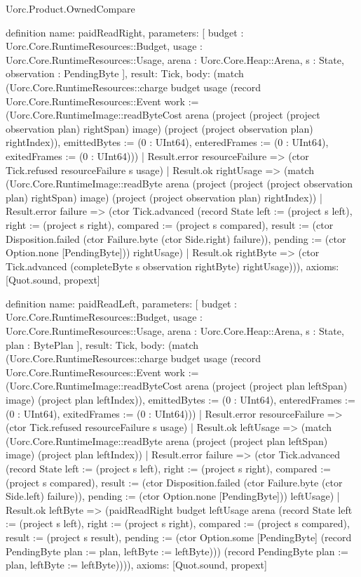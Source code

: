 \begin{lexlean}{Uorc.Product.OwnedCompare}
\begin{semanticmodule}
definition{
  name: paidReadRight,
  parameters: [
    budget : Uorc.Core.RuntimeResources::Budget,
    usage : Uorc.Core.RuntimeResources::Usage,
    arena : Uorc.Core.Heap::Arena,
    s : State,
    observation : PendingByte
  ],
  result: Tick,
  body: (match (Uorc.Core.RuntimeResources::charge budget usage (record Uorc.Core.RuntimeResources::Event {work := (Uorc.Core.RuntimeImage::readByteCost arena (project (project (project observation plan) rightSpan) image) (project (project observation plan) rightIndex)), emittedBytes := (0 : UInt64), enteredFrames := (0 : UInt64), exitedFrames := (0 : UInt64)}))
    | Result.error resourceFailure => (ctor Tick.refused resourceFailure s usage)
    | Result.ok rightUsage => (match (Uorc.Core.RuntimeImage::readByte arena (project (project (project observation plan) rightSpan) image) (project (project observation plan) rightIndex))
      | Result.error failure => (ctor Tick.advanced (record State {left := (project s left), right := (project s right), compared := (project s compared), result := (ctor Disposition.failed (ctor Failure.byte (ctor Side.right) failure)), pending := (ctor Option.none [PendingByte])}) rightUsage)
      | Result.ok rightByte => (ctor Tick.advanced (completeByte s observation rightByte) rightUsage))),
  axioms: [Quot.sound, propext]
}

definition{
  name: paidReadLeft,
  parameters: [
    budget : Uorc.Core.RuntimeResources::Budget,
    usage : Uorc.Core.RuntimeResources::Usage,
    arena : Uorc.Core.Heap::Arena,
    s : State,
    plan : BytePlan
  ],
  result: Tick,
  body: (match (Uorc.Core.RuntimeResources::charge budget usage (record Uorc.Core.RuntimeResources::Event {work := (Uorc.Core.RuntimeImage::readByteCost arena (project (project plan leftSpan) image) (project plan leftIndex)), emittedBytes := (0 : UInt64), enteredFrames := (0 : UInt64), exitedFrames := (0 : UInt64)}))
    | Result.error resourceFailure => (ctor Tick.refused resourceFailure s usage)
    | Result.ok leftUsage => (match (Uorc.Core.RuntimeImage::readByte arena (project (project plan leftSpan) image) (project plan leftIndex))
      | Result.error failure => (ctor Tick.advanced (record State {left := (project s left), right := (project s right), compared := (project s compared), result := (ctor Disposition.failed (ctor Failure.byte (ctor Side.left) failure)), pending := (ctor Option.none [PendingByte])}) leftUsage)
      | Result.ok leftByte => (paidReadRight budget leftUsage arena (record State {left := (project s left), right := (project s right), compared := (project s compared), result := (project s result), pending := (ctor Option.some [PendingByte] (record PendingByte {plan := plan, leftByte := leftByte}))}) (record PendingByte {plan := plan, leftByte := leftByte})))),
  axioms: [Quot.sound, propext]
}


\end{semanticmodule}
\end{lexlean}
